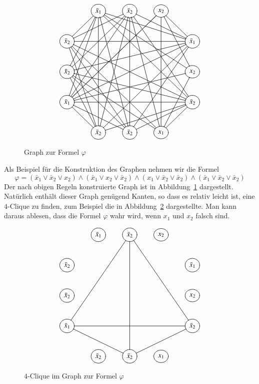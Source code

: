 \begin{beispiel}
\begin{figure}
\[
\entrymodifiers={++[o][F]}
\xymatrix{
*+\txt{}
	&{\bar x_1}
		\ar@{-}[dl] \ar@{-}[drrr] \ar@{-}[ddl] \ar@{-}[dddl]
		\ar@{-}[dddd] \ar@{-}[ddddr] 
		\ar@{-}[ddrrr] \ar@{-}[dddrrr]
		&{\bar x_2}
			\ar@{-}[dddll]
			\ar@{-}[ddddl] \ar@{-}[dddd] \ar@{-}[ddddr]
			\ar@{-}[drr] \ar@{-}[dddrr]
			\ar@{-}[dll] \ar@{-}[ddll]
			&{x_2}
				\ar@{-}[dddlll] \ar@{-}[dddlll]
				\ar@{-}[dddd]
				\ar@{-}[dr] \ar@{-}[ddr]
\\
{\bar x_2}
	\ar@{-}[rrrr] \ar@{-}[rrrrdd]
	\ar@{-}[dddr] \ar@{-}[dddrr] \ar@{-}[dddrrr]
	&*+\txt{}
		&*+\txt{}
			&*+\txt{}
				&{\bar x_1}
					\ar@{-}[dllll] \ar@{-}[ddllll]
					\ar@{-}[dddlll] \ar@{-}[dddll]
\\
{\bar x_2}
	\ar@{-}[rrrrd]
	\ar@{-}[ddr] \ar@{-}[ddrr] \ar@{-}[ddrrr]
	&*+\txt{}
		&*+\txt{}
			&*+\txt{}
				&{x_2}
					\ar@{-}[dllll]
					\ar@{-}[ddl]
\\
{\bar x_1}
	\ar@{-}[rrrr]
	\ar@{-}[dr] \ar@{-}[drr]
	&*+\txt{}
		&*+\txt{}
			&*+\txt{}
				&{\bar x_2}
					\ar@{-}[dlll] \ar@{-}[dll] \ar@{-}[dl]
\\
*+\txt{}
	&{\bar x_2}
		&{\bar x_2}
			&{x_1}
}
\]
\caption{Graph zur Formel $\varphi$\label{phiformel}}
\end{figure}%
Als Beispiel für die Konstruktion des Graphen nehmen wir die Formel
\[
\varphi
=
(\bar x_1\vee \bar x_2\vee x_2)
\wedge
(\bar x_1\vee x_2\vee \bar x_2)
\wedge
(x_1\vee \bar x_2\vee \bar x_2)
\wedge
(\bar x_1\vee \bar x_2\vee \bar x_2)
\]
Der nach obigen Regeln konstruierte Graph ist in Abbildung~\ref{phiformel}
dargestellt.
Natürlich enthält dieser Graph genügend Kanten, so dass es relativ
leicht ist, eine $4$-Clique zu finden, zum Beispiel die in Abbildung~\ref{phiclique} dargestellte. Man kann daraus ablesen, dass die Formel $\varphi$
wahr wird, wenn $x_1$ und $x_2$ falsch sind.
\begin{figure}
\[
\entrymodifiers={++[o][F]}
\xymatrix{
*+\txt{}
	&{\bar x_1}
		&{\bar x_2}
			\ar@{-}[dddll]
			\ar@{-}[dddd]
			\ar@{-}[dddrr]
			&{x_2}
\\
{\bar x_2}
	&*+\txt{}
		&*+\txt{}
			&*+\txt{}
				&{\bar x_1}
\\
{\bar x_2}
	&*+\txt{}
		&*+\txt{}
			&*+\txt{}
				&{x_2}
\\
{\bar x_1}
	\ar@{-}[rrrr]
	\ar@{-}[drr]
	&*+\txt{}
		&*+\txt{}
			&*+\txt{}
				&{\bar x_2}
					\ar@{-}[dll]
\\
*+\txt{}
	&{\bar x_2}
		&{\bar x_2}
			&{x_1}
}
\]
\caption{$4$-Clique im Graph zur Formel $\varphi$\label{phiclique}}
\end{figure}%
\end{beispiel}

